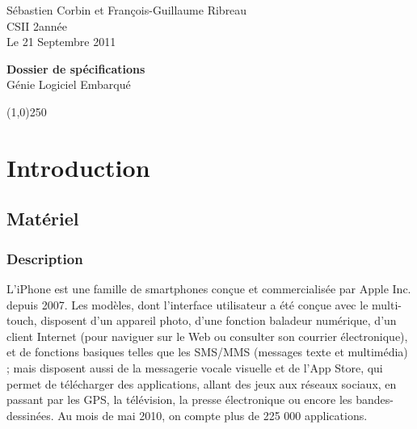 \documentclass[a4paper,12pt]{report}
\begin{document}
  \begin{onehalfspace}

    \begin{titlepage}
      \begin{center}
        Sébastien Corbin et François-Guillaume Ribreau\\
        CSII 2\ieme année\\
        Le 21 Septembre 2011\\
      \end{center}
      \hrulefill
      \vspace{7cm}
      \begin{center}
        \LARGE \textbf{Dossier de spécifications}\\
        \vspace{3cm}
        \normalsize Génie Logiciel Embarqué
      \end{center}

      \vspace{9,5cm}

      \begin{center}
      \line(1,0){250}
      \end{center}

      \begin{center}
      \tiny{\currfilename}
      \end{center}


    \end{titlepage}
    \clearpage

  \thispagestyle{empty}
  \setcounter{page}{0}
  \clearpage

\chapter{Introduction}

\section{Matériel}
\subsection{Description}
L'iPhone  est une famille de smartphones conçue et commercialisée par Apple Inc. depuis 2007. Les modèles, dont l'interface utilisateur a été conçue avec le multi-touch, disposent d'un appareil photo, d'une fonction baladeur numérique, d'un client Internet (pour naviguer sur le Web ou consulter son courrier électronique), et de fonctions basiques telles que les SMS/MMS (messages texte et multimédia) ; mais disposent aussi de la messagerie vocale visuelle et de l'App Store, qui permet de télécharger des applications, allant des jeux aux réseaux sociaux, en passant par les GPS, la télévision, la presse électronique ou encore les bandes-dessinées. Au mois de mai 2010, on compte plus de 225 000 applications.


\end{onehalfspace}
\end{document}
